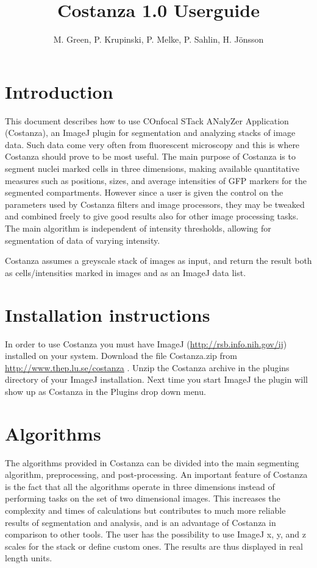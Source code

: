 \documentclass[a4paper,12pt]{article}
\title{Costanza 1.0 Userguide}
\author{M. Green, P. Krupinski, P. Melke, P. Sahlin, H. Jönsson}
\begin{document}
\maketitle


\section{Introduction}
This document describes how to use COnfocal STack ANalyZer Application
(Costanza), an ImageJ\cite{Abramoff2004} plugin for segmentation and analyzing
stacks of image data. Such data come very often from fluorescent microscopy and
this is where Costanza should prove to be most useful. The main purpose of
Costanza is to segment nuclei marked cells in three dimensions, making
available quantitative measures such as positions, sizes, and average
intensities of GFP markers for the segmented compartments. However since a user
is given the control on the parameters used by Costanza filters and image
processors, they may be tweaked and combined freely to give good results also
for other image processing tasks. The main algorithm is independent of
intensity thresholds, allowing for segmentation of data of varying intensity.

Costanza assumes a greyscale stack of images as input, and return the result
both as cells/intensities marked in images and as an ImageJ data list.

\section{Installation instructions}
In order to use Costanza you must have ImageJ
(\url{http://rsb.info.nih.gov/ij}) installed on your system. Download the
file Costanza.zip from
\url{http://www.thep.lu.se/costanza} .
Unzip the Costanza archive in the plugins directory of your ImageJ
installation. Next time you start ImageJ the plugin will show up as Costanza
in the Plugins drop down menu.

\section{Algorithms}
The algorithms provided in Costanza can be divided into the main segmenting
algorithm, preprocessing, and post-processing. An important feature of
Costanza is the fact that all the algorithms operate in three dimensions
instead of performing tasks on the set of two dimensional images. This
increases the complexity and times of calculations but contributes to much
more reliable results of segmentation and analysis, and is an advantage of
Costanza in comparison to other tools. The user has the possibility to use
ImageJ x, y, and z scales for the stack or define custom ones. The results are
thus displayed in real length units.
\end{document}
